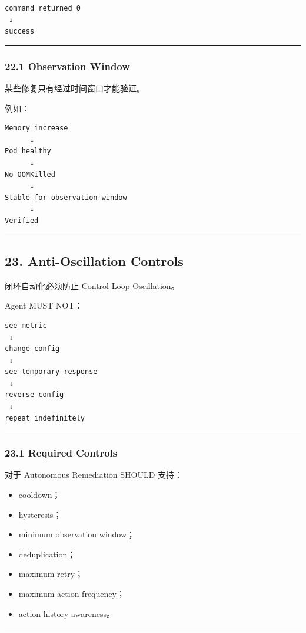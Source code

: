 \documentclass[11pt,a4paper]{article}
\begin{document}
\begin{lstlisting}[language=text]
command returned 0
 ↓
success
\end{lstlisting}
\vspace{0.5em}\hrule\vspace{0.5em}
\subsubsection{22.1 Observation Window}
某些修复只有经过时间窗口才能验证。

例如：

\begin{lstlisting}[language=text]
Memory increase
      ↓
Pod healthy
      ↓
No OOMKilled
      ↓
Stable for observation window
      ↓
Verified
\end{lstlisting}
\vspace{0.5em}\hrule\vspace{0.5em}
\subsection{23. Anti-Oscillation Controls}
闭环自动化必须防止 Control Loop Oscillation。

Agent MUST NOT：

\begin{lstlisting}[language=text]
see metric
 ↓
change config
 ↓
see temporary response
 ↓
reverse config
 ↓
repeat indefinitely
\end{lstlisting}
\vspace{0.5em}\hrule\vspace{0.5em}
\subsubsection{23.1 Required Controls}
对于 Autonomous Remediation SHOULD 支持：

\begin{itemize}
  \item cooldown；
  \item hysteresis；
  \item minimum observation window；
  \item deduplication；
  \item maximum retry；
  \item maximum action frequency；
  \item action history awareness。
\end{itemize}
\vspace{0.5em}\hrule\vspace{0.5em}
\end{document}
